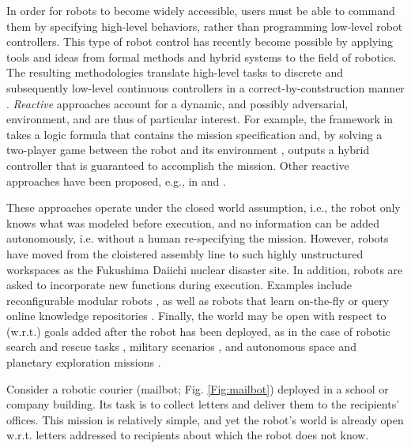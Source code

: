 In order for robots to become widely accessible, users must be able to command them by specifying high-level behaviors, rather than programming low-level robot controllers.
This type of robot control has recently become possible by applying tools and ideas from formal methods and hybrid systems to the field of robotics. The resulting methodologies translate high-level tasks to discrete and subsequently low-level continuous controllers in a correct-by-contstruction manner \cite{BBEFKP06, KGFP_TRO09, KaramanCDC2009, Wongpiromsarn2010, LaValleRSS2011, BhatiaRAM2011, Belta2013RSS}.
\emph{Reactive} approaches account for a dynamic, and possibly adversarial, environment, and are thus of particular interest. For example, the framework in \cite{KGFP_TRO09} takes a logic formula that contains the mission specification and, by solving a two-player game between the robot and its environment \cite{piterman_06}, outputs a hybrid controller that is guaranteed to accomplish the mission. Other reactive approaches have been proposed, e.g., in \cite{Wongpiromsarn2010} and \cite{Belta2013RSS}.

These approaches operate under the closed world assumption, i.e., the robot only knows what was modeled before execution, and no information can be added autonomously, i.e. without a human re-specifying the mission.
However, robots have moved from the cloistered assembly line to such highly unstructured workspaces as the Fukushima Daiichi nuclear disaster site. 
In addition, robots are asked to incorporate new functions during execution. 
Examples include reconfigurable modular robots \cite{ModularIROS2011}, as well as robots that learn on-the-fly \cite{SaxenaIJRR2012} or query online knowledge repositories \cite{rapyuta2013}. 
Finally, the world may be open with respect to (w.r.t.) goals added after the robot has been deployed, as in the case of robotic search and rescue tasks \cite{MatthiasAI2010}, military scenarios \cite{gda2013}, and autonomous space and planetary exploration missions \cite{spaceXplore2006}. 

\begin{myExample}\label{Ex:mailbot1}
Consider a robotic courier (mailbot; Fig. \ref{Fig:mailbot}) deployed in a school or company building. 
Its task is to collect letters and deliver them to the recipients' offices. 
This mission is relatively simple, and yet the robot's world is already open w.r.t. letters addressed to recipients about which the robot does not know. %
\end{myExample}

